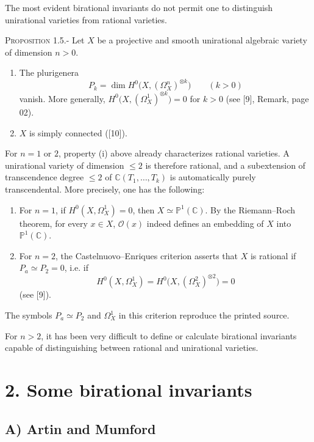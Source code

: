 \documentclass[10pt]{article}
\newcommand{\CC}{\mathbb C}
\newcommand{\PP}{\mathbb P}
\newcommand{\cO}{\mathcal O}
\newcommand{\sourcehead}[1]{\par\medskip\noindent\textsc{#1}\quad}
\begin{document}
The most evident birational invariants do not permit one to distinguish
unirational varieties from rational varieties.

\sourcehead{Proposition 1.5.-} Let \(X\) be a projective and smooth unirational
algebraic variety of dimension \(n>0\).
\begin{enumerate}[label=(\roman*)]
\item The plurigenera
\[
  P_k=\dim H^0\bigl(X,(\Omega_X^n)^{\otimes k}\bigr)\qquad(k>0)
\]
vanish. More generally,
\(H^0\bigl(X,(\Omega_X^1)^{\otimes k}\bigr)=0\) for \(k>0\)
(see [9], Remark, page 02).
\item \(X\) is simply connected ([10]).
\end{enumerate}

For \(n=1\) or \(2\), property (i) above already characterizes rational
varieties. A unirational variety of dimension \(\leq 2\) is therefore rational,
and a subextension of transcendence degree \(\leq 2\) of
\(\CC(T_1,\ldots,T_k)\) is automatically purely transcendental. More precisely,
one has the following:

\begin{enumerate}[label=\alph*)]
\item For \(n=1\), if \(H^0(X,\Omega_X^1)=0\), then
\(X\simeq\PP^1(\CC)\). By the Riemann--Roch theorem, for every \(x\in X\),
\(\cO(x)\) indeed defines an embedding of \(X\) into \(\PP^1(\CC)\).

\item For \(n=2\), the Castelnuovo--Enriques criterion asserts that \(X\) is
rational if \(P_a\simeq P_2=0\), i.e. if
\[
  H^0(X,\Omega_X^1)=H^0\bigl(X,(\Omega_X^2)^{\otimes2}\bigr)=0
\]
(see [9]).
\end{enumerate}
The symbols \(P_a\simeq P_2\) and \(\Omega_X^1\) in this criterion reproduce
the printed source.

For \(n>2\), it has been very difficult to define or calculate birational
invariants capable of distinguishing between rational and unirational
varieties.

\section*{2. Some birational invariants}

\subsection*{A) Artin and Mumford}
\end{document}
